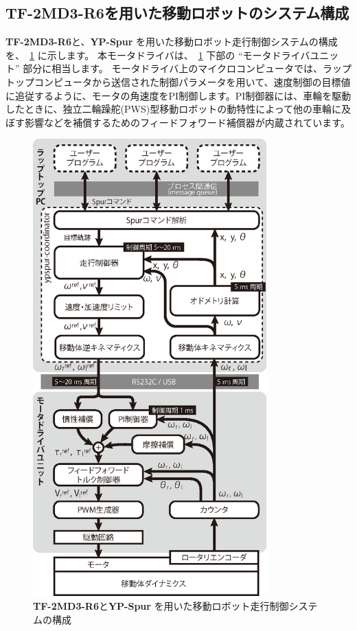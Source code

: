 \documentclass[11pt,a4j,openany]{jbook}
\begin{document}
\newpage
\subsection{{\bf TF-2MD3-R6}を用いた移動ロボットのシステム構成}
\label{sec:システム構成}

{\bf TF-2MD3-R6}と、{\bf YP-Spur} を用いた移動ロボット走行制御システムの構成を、\figurename~\ref{fig:yp-system} に示します。
本モータドライバは、\figurename~\ref{fig:yp-system} 下部の ``モータドライバユニット'' 部分に相当します。
モータドライバ上のマイクロコンピュータでは、ラップトップコンピュータから送信された制御パラメータを用いて、速度制御の目標値に追従するように、モータの角速度をPI制御します。PI制御器には、車輪を駆動したときに、独立二輪躁舵(PWS)型移動ロボットの動特性によって他の車輪に及ぼす影響などを補償するためのフィードフォワード補償器\cite{the:pws_ff_cnt}\cite{the:vehicle_control}が内蔵されています。\par
\begin{figure}[H]
\centering\includegraphics[width=90mm]{system2.eps}
\caption{{\bf TF-2MD3-R6}と{\bf YP-Spur} を用いた移動ロボット走行制御システムの構成}
\label{fig:yp-system}
\end{figure}
\end{document}
